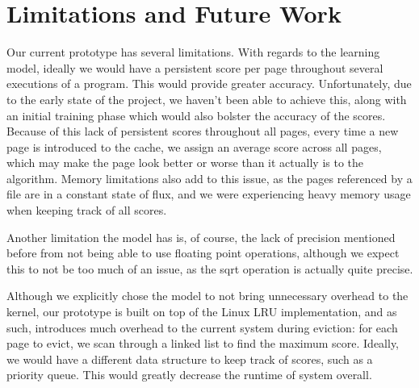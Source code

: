 \section{Limitations and Future Work}
Our current prototype has several limitations. With regards to the learning model, ideally we would have a persistent score per page throughout several executions of a program. This would provide greater accuracy. Unfortunately, due to the early state of the project, we haven't been able to achieve this, along with an initial training phase which would also bolster the accuracy of the scores. Because of this lack of persistent scores throughout all pages, every time a new page is introduced to the cache, we assign an average score across all pages, which may make the page look better or worse than it actually is to the algorithm. Memory limitations also add to this issue, as the pages referenced by a file are in a constant state of flux, and we were experiencing heavy memory usage when keeping track of all scores.

Another limitation the model has is, of course, the lack of precision mentioned before from not being able to use floating point operations, although we expect this to not be too much of an issue, as the sqrt operation is actually quite precise.

Although we explicitly chose the model to not bring unnecessary overhead to the kernel, our prototype is built on top of the Linux LRU implementation, and as such, introduces much overhead to the current system during eviction: for each page to evict, we scan through a linked list to find the maximum score. Ideally, we would have a different data structure to keep track of scores, such as a priority queue. This would greatly decrease the runtime of system overall.  